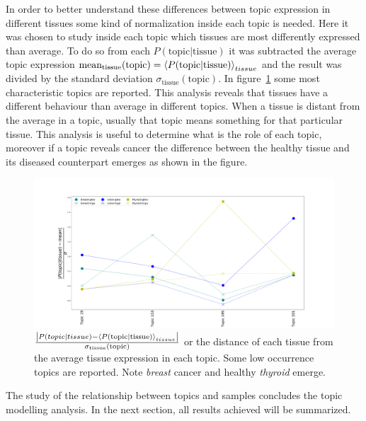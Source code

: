 In order to better understand these differences between topic expression in different tissues some kind of normalization inside each topic is needed. Here it was chosen to study inside each topic which tissues are most differently expressed than average. To do so from each $P(\text{topic}| \text{tissue})$ it was subtracted the average topic expression $\text{mean}_{\text{tissue}}(\text{topic})=\left\langle P(\text{topic}| \text{tissue})\right\rangle_{tissue}$ and the result was divided by the standard deviation $\sigma_{\text{tissue}}(\text{topic})$. In figure~\ref{fig:topic/merged/lifeplot_normalised_level3_hd} some most characteristic topics are reported. This analysis reveals that tissues have a different behaviour than average in different topics. When a tissue is distant from the average in a topic, usually that topic means something for that particular tissue. This analysis is useful to determine what is the role of each topic, moreover if a topic reveals cancer the difference between the healthy tissue and its diseased counterpart emerges as shown in the figure.
\begin{figure}[htb!]
	\centering
	\includegraphics[width=0.85\linewidth]{pictures/topic/merged/lifeplot_normalised_level3_hd.pdf}
	\caption{$\frac{\left|P(topic | tissue) - \left\langle P(\text{topic}| \text{tissue})\right\rangle_{tissue}\right|}{\sigma_{\text{tissue}}(\text{topic})}$ or the distance of each tissue from the average tissue expression in each topic. Some low occurrence topics are reported. Note \textit{breast} cancer and healthy \textit{thyroid} emerge.}
	\label{fig:topic/merged/lifeplot_normalised_level3_hd}
\end{figure}

The study of the relationship between topics and samples concludes the topic modelling analysis. In the next section, all results achieved will be summarized.